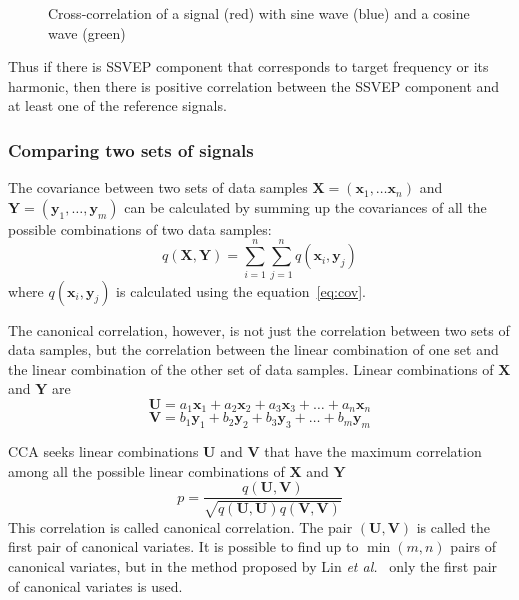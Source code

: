 \begin{figure}[h!]
	
	\caption{Cross-correlation of a signal (red) with sine wave (blue) and a cosine wave (green)}
	\label{fig:cross_corr}
\end{figure}

Thus if there is \gls{SSVEP} component that corresponds to \gls{target} frequency or its \gls{harmonic}, then there is positive correlation between the \gls{SSVEP} component and at least one of the reference signals.

\subsubsection{Comparing two sets of signals}

The covariance between two sets of data samples $\mathbf{X}=(\mathbf{x}_1,\dots\mathbf{x}_n)$ and $\mathbf{Y}=(\mathbf{y}_1,\dots,\mathbf{y}_m)$ can be calculated by summing up the covariances of all the possible combinations of two data samples:
\begin{equation}
	q(\mathbf{X}, \mathbf{Y}) = \sum_{i=1}^{n}\sum_{j=1}^{n}q(\mathbf{x}_i, \mathbf{y}_j)
\end{equation}
where $q(\mathbf{x}_i, \mathbf{y}_j)$ is calculated using the equation~\ref{eq:cov}.

The canonical correlation, however, is not just the correlation between two sets of data samples, but the correlation between the linear combination of one set and the linear combination of the other set of data samples. Linear combinations of $\mathbf{X}$ and $\mathbf{Y}$ are
\begin{equation*}
	\mathbf{U} = a_1\mathbf{x}_1 + a_2\mathbf{x}_2 + a_3\mathbf{x}_3 + \dots + a_n\mathbf{x}_n
\end{equation*}
\begin{equation*}
	\mathbf{V} = b_1\mathbf{y}_1 + b_2\mathbf{y}_2 + b_3\mathbf{y}_3 + \dots + b_m\mathbf{y}_m
\end{equation*}

\gls{CCA} seeks linear combinations $\mathbf{U}$ and $\mathbf{V}$ that have the maximum correlation among all the possible linear combinations of $\mathbf{X}$ and $\mathbf{Y}$
\begin{equation}
	p = \frac{q(\mathbf{U}, \mathbf{V})}{\sqrt{q(\mathbf{U},\mathbf{U})q(\mathbf{V},\mathbf{V})}}
\end{equation}
This correlation is called canonical correlation. The pair $(\mathbf{U}, \mathbf{V})$ is called the first pair of canonical variates. It is possible to find up to $\min(m, n)$ pairs of canonical variates, but in the method proposed by Lin \textit{et al.}~\cite{cca_lin} only the first pair of canonical variates is used.

